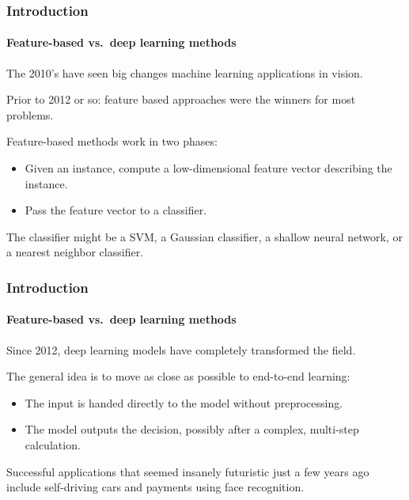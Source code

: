 \documentclass[aspectratio=169]{beamer}
\begin{document}
\begin{frame}
\frametitle{Introduction}
\framesubtitle{Feature-based vs.\ deep learning methods}

The 2010's have seen big changes machine learning applications in vision.

\medskip

Prior to 2012 or so: \alert{feature based} approaches were the winners
for most problems.

\medskip

Feature-based methods work in two phases:
\begin{itemize}
\item Given an instance, compute a low-dimensional feature vector
  describing the instance.
\item Pass the feature vector to a classifier.
\end{itemize}

\medskip

The classifier might be a SVM, a Gaussian classifier, a shallow neural
network, or a nearest neighbor classifier.

\end{frame}


\begin{frame}
\frametitle{Introduction}
\framesubtitle{Feature-based vs.\ deep learning methods}

Since 2012, \alert{deep learning} models have completely transformed
the field.

\medskip

The general idea is to move as close as possible to \alert{end-to-end}
learning:
\begin{itemize}
\item The input is handed directly to the model without preprocessing.
\item The model outputs the decision, possibly after a complex,
  multi-step calculation.
\end{itemize}

\medskip

Successful applications that seemed insanely futuristic just a few
years ago include self-driving cars and payments using face
recognition.

\end{frame}
\end{document}
